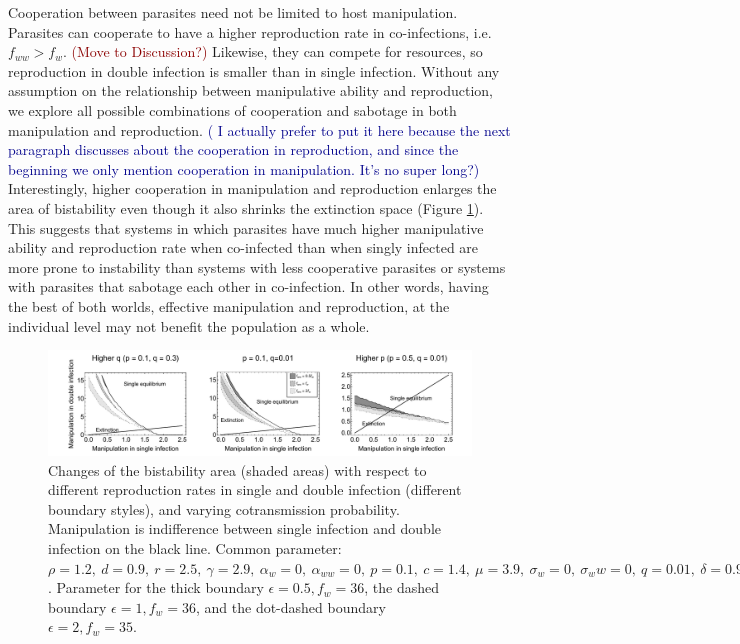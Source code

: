 \documentclass[11pt]{article}
\newcommand{\cha}[1]{\textcolor{darkred}{(#1)}}
\newcommand{\ph}[1]{\textcolor{darkblue}{(#1)}}
\begin{document}
Cooperation between parasites need not be limited to host manipulation. Parasites can cooperate to have a higher reproduction rate in co-infections, i.e. $f_{ww} > f_w$. 
\cha{Move to Discussion?} Likewise, they can compete for resources, so reproduction in double infection is smaller than in single infection. 
Without any assumption on the relationship between manipulative ability and reproduction, we explore all possible combinations of cooperation and sabotage in both manipulation and reproduction. \ph{ I actually prefer to put it here because the next paragraph discusses about the cooperation in reproduction, and since the beginning we only mention cooperation in manipulation. It's no super long?}
Interestingly, higher cooperation in manipulation and reproduction enlarges the area of bistability even though it also shrinks the extinction space (Figure \ref{fig:manipbifur}). 
This suggests that systems in which parasites have much higher manipulative ability and reproduction rate when co-infected than when singly infected are more prone to instability than systems with less cooperative parasites or systems with parasites that sabotage each other in co-infection. 
In other words, having the best of both worlds, effective manipulation and reproduction, at the individual level may not benefit the population as a whole.

\begin{figure}[!ht]
\centering
\includegraphics[width=\textwidth]{Figures/manip_bifurcation.pdf}
\caption{Changes of the bistability area (shaded areas) with respect to different reproduction rates in single and double infection (different boundary styles), and varying cotransmission probability. Manipulation is indifference between single infection and double infection on the black line. Common parameter:  $\rho = 1.2, \ d = 0.9, \ r = 2.5, \ \gamma = 2.9, \ \alpha_w = 0, \ \alpha_{ww} = 0, \ p = 0.1, \ c = 1.4, \ \mu = 3.9, \ \sigma_w = 0, \ \sigma_ww = 0, \ q = 0.01, \ \delta = 0.9, \ k = 0.26, \ \epsilon = 0.5$. Parameter for the thick boundary $\epsilon = 0.5, f_w = 36$, the dashed boundary $\epsilon = 1, f_w = 36$, and the dot-dashed boundary $\epsilon = 2, f_w = 35$.}
\label{fig:manipbifur}
\end{figure}
\end{document}
